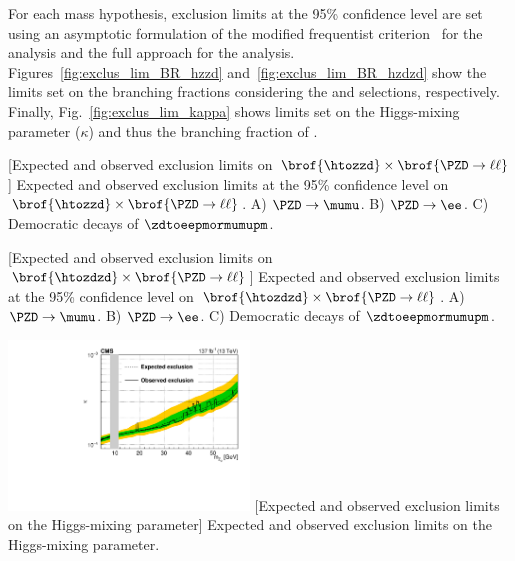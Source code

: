 For each mass hypothesis, exclusion limits at the 95\% confidence level are set using an asymptotic formulation of the modified frequentist \CLs criterion~\cite{cowan_asymptotic_2011, higgs_combo_proc_2011} for the \zzd analysis and the full \CLs approach for the \zdzd analysis.
Figures~\ref{fig:exclus_lim_BR_hzzd} and~\ref{fig:exclus_lim_BR_hzdzd} show the limits set on the branching fractions considering the \zzd and \zdzd selections, respectively.
Finally, Fig.~\ref{fig:exclus_lim_kappa} shows limits set on the Higgs-mixing parameter ($\kappa$) and thus the branching fraction of \htozdzd.
\begin{multiFigure}
    \centering
        [Expected and observed exclusion limits on $\brof{\htozzd} \times \brof{\PZD \to \ell\ell}$] %
        {Expected and observed exclusion limits at the 95\% confidence level on $\brof{\htozzd} \times \brof{\PZD \to \ell\ell}$. %
        \;A) $\PZD \to \mumu$.
        \;B) $\PZD \to \ee$.
        \;C) Democratic decays of $\zdtoeepmormumupm$.}
    \label{fig:exclus_lim_BR_hzzd}
\end{multiFigure}
\begin{multiFigure}
    \centering
        [Expected and observed exclusion limits on $\brof{\htozdzd} \times \brof{\PZD \to \ell\ell}$] %
        {Expected and observed exclusion limits at the 95\% confidence level on $\brof{\htozdzd} \times \brof{\PZD \to \ell\ell}$. %
        \;A) $\PZD \to \mumu$.
        \;B) $\PZD \to \ee$.
        \;C) Democratic decays of $\zdtoeepmormumupm$.}
    \label{fig:exclus_lim_BR_hzdzd}
\end{multiFigure}
\begin{multiFigure}
    \centering
        \includegraphics[width=0.48\textwidth]{figures/dilep_res/exclus_lim_kappa.pdf}
        [Expected and observed exclusion limits on the Higgs-mixing parameter] %
        {Expected and observed exclusion limits on the Higgs-mixing parameter.} %
    \label{fig:exclus_lim_kappa}
\end{multiFigure}

